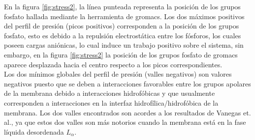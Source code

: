\documentclass[12pt]{article}
\begin{document}
En la figura \ref{fig:stress2}, la l\'{i}nea punteada representa la posici\'{o}n de los grupos fosfato hallada mediante la herramienta de gromacs. Los dos m\'{a}ximos positivos del perfil de presi\'{o}n (picos positivos) corresponden a la posici\'{o}n de los grupos fosfato, esto es debido a la repulsi\'{o}n electrost\'{a}tica entre los f\'{o}sforos, los cuales poseen cargas ani\'{o}nicas, lo cual induce un trabajo positivo sobre el sistema, sin embargo, en la figura \ref{fig:stress2} la posici\'{o}n de los grupos fosfato de gromacs aparece desplazada hacia el centro respecto a los picos correspondientes.\\

Los dos m\'{i}nimos globales del perfil de presi\'{o}n (valles negativos) son valores negativos puesto que se deben a interacciones favorables entre los grupos apolares de la membrana debido a interacciones hidrof\'{o}bicas y que usualmente corresponden a interacciones en la interfaz hidrof\'{i}lica/hidrof\'{o}bica de la membrana. Los dos valles encontrados son acordes a los resultados de Vanegas et. al., ya que estos dos valles son m\'{a}s notorios cuando la membrana est\'{a} en la fase l\'{i}quida desordenada $L_{\alpha}$.\\
\end{document}
